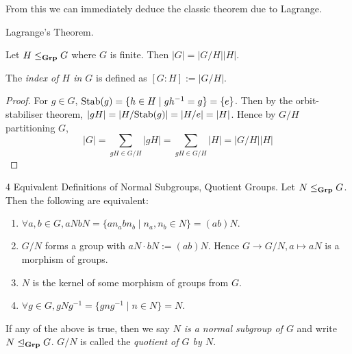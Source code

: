\documentclass[../../book.tex]{subfiles}
\begin{document}
From this we can immediately deduce the classic theorem due to Lagrange. 

\begin{cor} Lagrange's Theorem. 

    Let $H \leq_{\mathbf{Grp}} G$ where $G$ is finite. 
    Then $|G| = |G / H||H|.$
    
    The \emph{index of $H$ in $G$} is defined as $[G : H] := |G / H|$. 
\end{cor}
\begin{proof}
    For $g \in G$, $\mathrm{Stab}(g) = \{h \in H \mid gh^{-1} = g\} = \{e\}$.
    Then by the orbit-stabiliser theorem, $|gH| = |H/\mathrm{Stab}(g)| = |H/{e}| = |H|$.
    Hence by $G / H$ partitioning $G$, 
    \[
        |G| = \sum_{gH \in G/H} |gH| = \sum_{gH \in G/H} |H| = |G/H| |H|
    \]
\end{proof}
\begin{dfn} 4 Equivalent Definitions of Normal Subgroups, Quotient Groups. 
    Let $N \leq_{\mathbf{Grp}} G$. 
    Then the following are equivalent: 
    \begin{enumerate}
        \item $\forall a, b \in G, aNbN = 
        \{an_abn_b \mid n_a, n_b \in N\} = (ab)N.$
        \item $G / N$ forms a group with $aN \cdot bN := (ab)N$.
            Hence $G \to G/N, a \mapsto aN$ is a morphism of groups.
        \item $N$ is the kernel of some morphism of groups from $G$. 
        \item $\forall g \in G, gNg^{-1} = \{gng^{-1} \mid n \in N\} = N$. 
    \end{enumerate}
    If any of the above is true, 
    then we say \emph{$N$ is a normal subgroup of $G$}
    and write $N \trianglelefteq_{\mathbf{Grp}} G$. 
    $G/N$ is called the \emph{quotient of $G$ by $N$}. 
\end{dfn}
\end{document}
